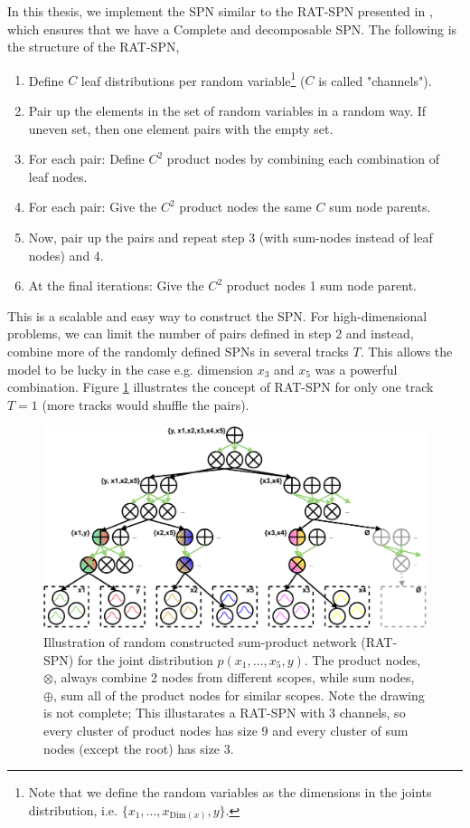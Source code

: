 In this thesis, we implement the SPN similar to the RAT-SPN presented in \cite{RAT_SPN}, 
which ensures that we have a Complete and decomposable SPN. The following is the structure of 
the RAT-SPN,
\begin{enumerate}[noitemsep]
    \item Define $C$ leaf distributions per random variable\footnote{Note that we define the random
    variables as the dimensions in the joints distribution, i.e. $\{x_1, ..., x_{\text{Dim}(x)},
    y\}$.} ($C$ is called "channels").
    \item Pair up the elements in the set of random variables in a random way. If uneven set, then
    one element pairs with the empty set.
    \item For each pair: Define $C^2$ product nodes by combining each combination of leaf nodes. 
    \item For each pair: Give the $C^2$ product nodes the same $C$ sum node parents. 
    \item Now, pair up the pairs and repeat step 3 (with sum-nodes instead of leaf nodes) and 4.  
    \item At the final iterations: Give the $C^2$ product nodes 1 sum node parent.
\end{enumerate}
 This is a scalable and easy way to construct the SPN. For high-dimensional problems, we can limit the number
of pairs defined in step 2 and instead, combine more of the randomly defined SPNs in several tracks $T$. This allows the
model to be lucky in the case e.g. dimension $x_3$ and $x_5$ was a powerful combination. Figure \ref{SPN_graph_illu}
illustrates the concept of RAT-SPN for only one track $T=1$ (more tracks would shuffle the pairs).

\begin{figure}[H]
    \centering
    \includegraphics[width=\textwidth]{Pictures/SPN_illustration_graph3.pdf}
    \caption{Illustration of random constructed sum-product network (RAT-SPN) for the joint
    distribution $p(x_1, \dots, x_5, y)$. The product nodes, $\otimes$, always combine 2 nodes from different
    scopes, while sum nodes, $\oplus$, sum all of the product nodes for similar scopes. Note the drawing is not
    complete; This illustarates a RAT-SPN with 3 channels, so every cluster of product nodes has
    size 9 and every cluster of sum nodes (except the root) has size 3.}
     \label{SPN_graph_illu}
\end{figure}

